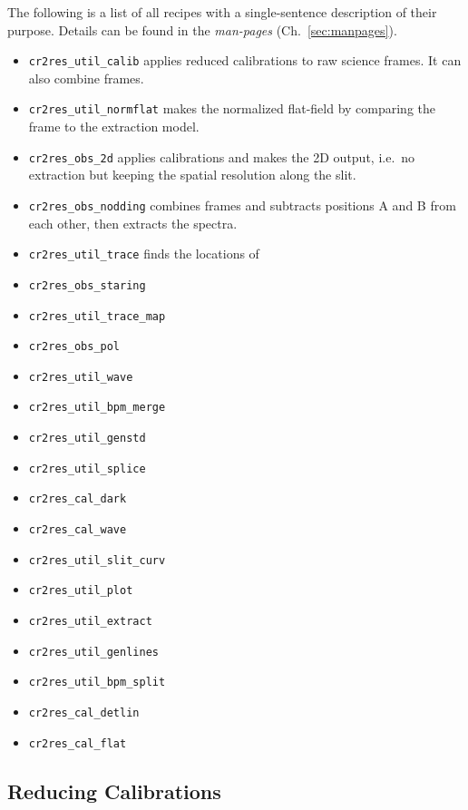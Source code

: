 The following is a list of all recipes with a single-sentence description of their purpose. Details can be found in the \emph{man-pages} (Ch.~\ref{sec:manpages}).

\begin{itemize}
\item \texttt{cr2res\_util\_calib} applies reduced calibrations to raw science frames. It can also combine frames.
\item \texttt{cr2res\_util\_normflat} makes the normalized flat-field by comparing the frame to the extraction model.
\item \texttt{cr2res\_obs\_2d} applies calibrations and makes the 2D output, i.e.~no extraction but keeping the spatial resolution along the slit.
\item \texttt{cr2res\_obs\_nodding} combines frames and subtracts positions A and B from each other, then extracts the spectra.
\item \texttt{cr2res\_util\_trace} finds the locations of 
\item \texttt{cr2res\_obs\_staring}
\item \texttt{cr2res\_util\_trace\_map}
\item \texttt{cr2res\_obs\_pol}
\item \texttt{cr2res\_util\_wave}
\item \texttt{cr2res\_util\_bpm\_merge}
\item \texttt{cr2res\_util\_genstd}
\item \texttt{cr2res\_util\_splice}
\item \texttt{cr2res\_cal\_dark}
\item \texttt{cr2res\_cal\_wave}
\item \texttt{cr2res\_util\_slit\_curv}
\item \texttt{cr2res\_util\_plot}
\item \texttt{cr2res\_util\_extract}
\item \texttt{cr2res\_util\_genlines}
\item \texttt{cr2res\_util\_bpm\_split}
\item \texttt{cr2res\_cal\_detlin}
\item \texttt{cr2res\_cal\_flat}
\end{itemize}




\subsection{Reducing Calibrations}
\label{sec:calib:reduc}

